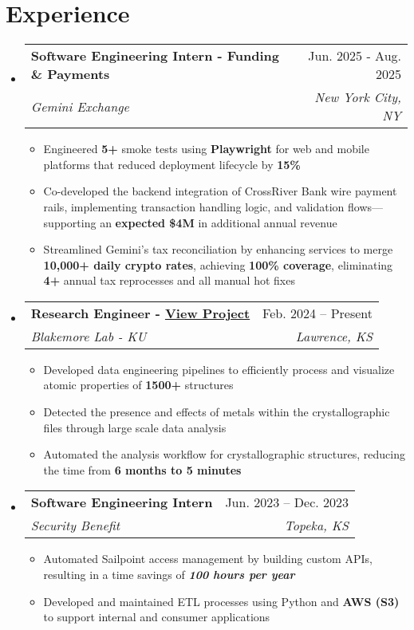 \documentclass[letterpaper,10.5pt]{article}
\makeatletter
\newcommand{\resumeItem}[1]{
  \item\small{
    {#1 \vspace{-2pt}}
  }
}
\newcommand{\resumeSubheading}[4]{
  \vspace{-2pt}\item
    \begin{tabular*}{0.97\textwidth}[t]{l@{\extracolsep{\fill}}r}
      \textbf{#1} & #2 \\
      \textit{\small#3} & \textit{\small #4} \\
    \end{tabular*}\vspace{-7pt}
}
\newcommand{\resumeSubSubheading}[2]{
    \item
    \begin{tabular*}{0.97\textwidth}{l@{\extracolsep{\fill}}r}
      \textit{\small#1} & \textit{\small #2} \\
    \end{tabular*}\vspace{-7pt}
}
\newcommand{\resumeSubHeadingListStart}{\begin{itemize}[leftmargin=0.15in, label={}]}
\newcommand{\resumeSubHeadingListEnd}{\end{itemize}}
\newcommand{\resumeItemListStart}{\begin{itemize}}
\newcommand{\resumeItemListEnd}{\end{itemize}\vspace{-5pt}}
\makeatother
\begin{document}
\section{Experience}
  \resumeSubHeadingListStart  
  \resumeSubheading
      {Software Engineering Intern - Funding \& Payments}{Jun. 2025 - Aug. 2025}
      {Gemini Exchange}{New York City, NY}
      \resumeItemListStart
         \resumeItem{Engineered \textbf{5+} smoke tests using \textbf{Playwright} for web and mobile platforms that reduced deployment lifecycle by \textbf{15\%}}
          \resumeItem{Co-developed the backend integration of CrossRiver Bank wire payment rails, implementing transaction handling logic, and validation flows—supporting an \textbf{expected \$4M} in additional annual revenue}
          \resumeItem{Streamlined Gemini's tax reconciliation by enhancing services to merge \textbf{10,000+ daily crypto rates}, achieving \textbf{100\% coverage}, eliminating \textbf{4+} annual tax reprocesses and all manual hot fixes}
      \resumeItemListEnd
  \resumeSubheading
      {Research Engineer - \href{https://tfsi-research.vercel.app}{\underline{View Project}}}{Feb. 2024 -- Present}
      {Blakemore Lab - KU}{Lawrence, KS}
      
      \resumeItemListStart
        \resumeItem{Developed data engineering pipelines to efficiently process and visualize atomic properties of \textbf{1500+} structures}
        \resumeItem{Detected the presence and effects of metals within the crystallographic files through large scale data analysis}
        \resumeItem{Automated the analysis workflow for crystallographic structures, reducing the time from \textbf{6 months to 5 minutes}}
        
      \resumeItemListEnd

   \resumeSubheading
      {Software Engineering Intern}{Jun. 2023 -- Dec. 2023}
      {Security Benefit}{Topeka, KS}
      \resumeItemListStart
        \resumeItem{Automated Sailpoint access management by building custom APIs, resulting in a time savings of \textbf{\emph{100 hours per year}}}
         \resumeItem{Developed and maintained ETL processes using Python and \textbf{AWS (S3)} to support internal and consumer applications}
      \resumeItemListEnd
      
       
      
  \resumeSubHeadingListEnd

      
\end{document}
